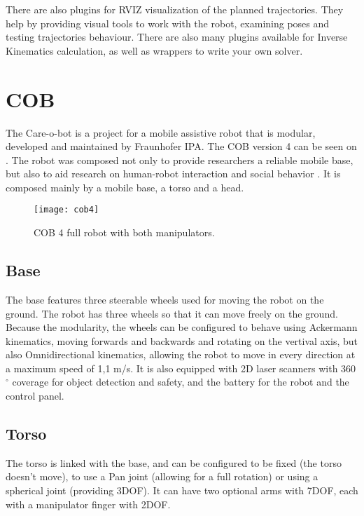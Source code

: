 There are also plugins for RVIZ visualization of the planned trajectories. They help by providing visual tools to work with the robot, examining poses and testing trajectories behaviour. There are also many plugins available for Inverse Kinematics calculation, as well as wrappers to write your own solver.

\section{COB}

The Care-o-bot is a project for a mobile assistive robot that is modular, developed and maintained by Fraunhofer IPA. The COB version 4 can be seen on . The robot was composed not only to provide researchers a reliable mobile base, but also to aid research on human-robot interaction and social behavior \cite{mci/Kittmann2015}. It is composed mainly by a mobile base, a torso and a head.

\begin{figure}[!ht]
\centering
\texttt{[image: cob4]}
\caption{COB 4 full robot with both manipulators.}
\label{fig:cob4}
\end{figure}

\subsection{Base}

The base features three steerable wheels used for moving the robot on the ground. The robot has three wheels so that it can move freely on the ground. Because the modularity, the wheels can be configured to behave using Ackermann kinematics, moving forwards and backwards and rotating on the vertival axis, but also Omnidirectional kinematics, allowing the robot to move in every direction at a maximum speed of 1,1 m/s. It is also equipped with 2D laser scanners with 360$^{\circ}$ coverage for object detection and safety, and the battery for the robot and the control panel.

\subsection{Torso}

The torso is linked with the base, and can be configured to be fixed (the torso doesn't move), to use a Pan joint (allowing for a full rotation) or using a spherical joint (providing 3DOF). It can have two optional arms with 7DOF, each with a manipulator finger with 2DOF.

